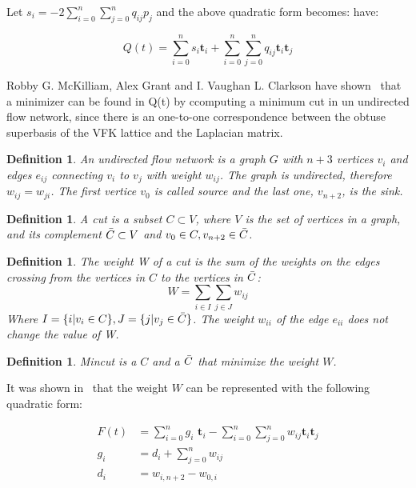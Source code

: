 \documentclass{amsart}
\newtheorem{definition}[theorem]{Definition}
\numberwithin{equation}{section}
\begin{document}
Let $s_i = - 2\sum_{i=0}^{n}\sum_{j=0}^{n}q_{ij}p_j$ and the above quadratic form becomes: have:

\begin{equation}
Q(t) = \sum_{i=0}^{n}s_i \textbf{t}_i + \sum_{i=0}^{n}\sum_{j=0}^{n}q_{ij}\textbf{t}_i\textbf{t}_j
\label{equation:VFK_QT}
\end{equation}

Robby G. McKilliam, Alex Grant and I. Vaughan L. Clarkson have shown~\cite{VFK-CVP} that a minimizer can be found in Q(t) by ccomputing a minimum cut in un undirected flow network, since there is an one-to-one correspondence between the obtuse superbasis of the VFK lattice and the Laplacian matrix. 

\begin{definition}
An undirected flow network is a graph $G$ with $n+3$ vertices $v_i$ and edges $e_{ij}$ connecting $v_i$ to $v_j$ with weight $w_{ij}$. The graph is undirected, therefore $w_{ij}=w_{ji}$. The first vertice $v_0$ is called source and the last one, $v_{n+2}$, is the sink.
\end{definition}

\begin{definition}
A cut is a subset $C \subset V$, where $V$ is the set of vertices in a graph, and its complement $\Bar{C} \subset V$ and $v_0 \in C, v_{n+2} \in \Bar{C}$.
\end{definition}

\begin{definition}
The weight W of a cut is the sum of the weights on the edges crossing from the vertices in $C$ to the vertices in $\Bar{C}$:
$$W = \sum_{i \in I} \sum_{j \in J} w_{ij}$$
Where $I=\{ i | v_i \in C\}, J=\{ j | v_j \in \Bar{C}\}$. The weight $w_{ii}$ of the edge $e_{ii}$ does not change the value of W.
\end{definition}

\begin{definition}
Mincut is a $C$ and a $\Bar{C}$ that minimize the weight $W$.
\end{definition}

It was shown in~\cite{VFK-CVP} that the weight $W$ can be represented with the following quadratic form:

\begin{equation}
\begin{split}
F(t) & = \sum_{i=0}^{n}g_i\textbf{ t}_i - \sum_{i=0}^{n}\sum_{j=0}^{n}w_{ij}\textbf{t}_i\textbf{t}_j \\
g_i & = d_i + \sum_{j=0}^{n}w_{ij} \\
d_i & = w_{i,n+2} - w_{0,i}
\end{split}
\label{equation:VFK_FT}
\end{equation}
\end{document}
